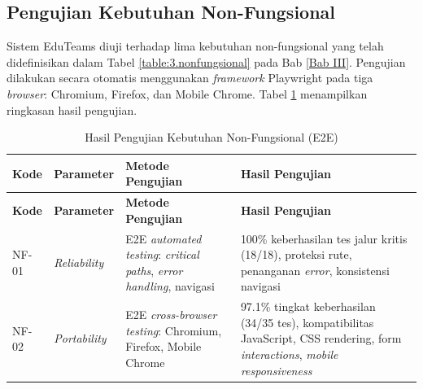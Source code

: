 \subsection{Pengujian Kebutuhan Non-Fungsional} \label{IV.NFR-Testing}

Sistem EduTeams diuji terhadap lima kebutuhan non-fungsional yang telah didefinisikan dalam Tabel \ref{table:3.nonfungsional} pada Bab \ref{Bab III}. Pengujian dilakukan secara otomatis menggunakan \textit{framework} Playwright pada tiga \textit{browser}: Chromium, Firefox, dan Mobile Chrome. Tabel \ref{tab:nfr-testing-results} menampilkan ringkasan hasil pengujian.

\begin{longtable}{|p{}|p{}|p{}|p{}|}
	\caption{Hasil Pengujian Kebutuhan Non-Fungsional (E2E)}
	\label{tab:nfr-testing-results}                                                                                                                                                                                                                                                                                                          \\
	\hline
	\textbf{Kode}                                      & \textbf{Parameter}                     & \textbf{Metode Pengujian}                                                                  & \textbf{Hasil Pengujian}                                                                                                                      \\
	\hline
	\endfirsthead
	\hline
	\textbf{Kode}                                      & \textbf{Parameter}                     & \textbf{Metode Pengujian}                                                                  & \textbf{Hasil Pengujian}                                                                                                                      \\
	\hline
	\endhead
	\hline
	\endfoot
	\hline
	\endlastfoot
	NF-01                                              & \textit{Reliability}                   & E2E \textit{automated testing}: \textit{critical paths}, \textit{error handling}, navigasi & 100\% keberhasilan tes jalur kritis (18/18), proteksi rute, penanganan \textit{error}, konsistensi navigasi                                   \\
	\hline
	NF-02                                              & \textit{Portability}                   & E2E \textit{cross-browser testing}: Chromium, Firefox, Mobile Chrome                       & 97.1\% tingkat keberhasilan (34/35 tes), kompatibilitas JavaScript, CSS rendering, form \textit{interactions}, \textit{mobile responsiveness} \\

\end{longtable}
